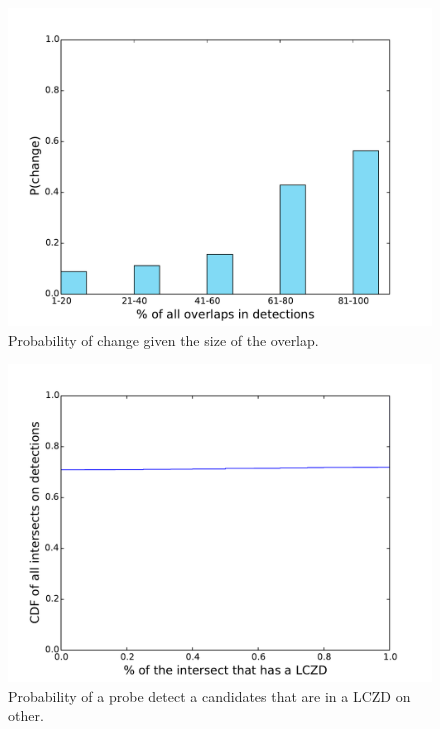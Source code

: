 \begin{figure}[t]
\begin{center}
\includegraphics[width=0.8\columnwidth]{figs/patching/probchange.pdf}
\caption{Probability of change given the size of the overlap. }
\label{fig:prob.change}
\end{center}
%
\end{figure}
%
\begin{figure}[t]
\begin{center}
\includegraphics[width=0.8\columnwidth]{figs/patching/overlapcoverage.pdf}
\caption{Probability of a probe detect a candidates that are in a LCZD on other.}
\label{fig:overlap.coverage}
\end{center}
%
\end{figure}
